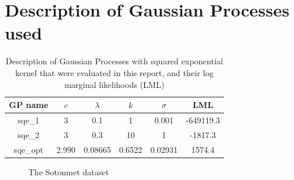 \documentclass{article}
\begin{document}
\section{Description of Gaussian Processes used}\label{appendix:gp_table}

\begin{table}[ht]
\centering
\begin{tabular}{|c|c|c|c|c|c|}
\hline
GP name  & $c$   & $\lambda$ & $k$    & $\sigma$ & LML       \\
\hline
sqe\_1   & 3     & 0.1       & 1      & 0.001    & -649119.3 \\
sqe\_2   & 3     & 0.3       & 10     & 1        & -1817.3   \\
sqe\_opt & 2.990 & 0.08665   & 0.6522 & 0.02931  & 1574.4    \\
\hline
\end{tabular}
\caption{Description of Gaussian Processes with squared exponential kernel that were evaluated in this report, and their log marginal likelihoods (LML)}
\label{table:sqe_table}
\end{table}

\begin{figure}[ht]
    \centering
    \caption{The Sotonmet dataset}
    \label{fig:sotonmet}
\end{figure}
\end{document}
